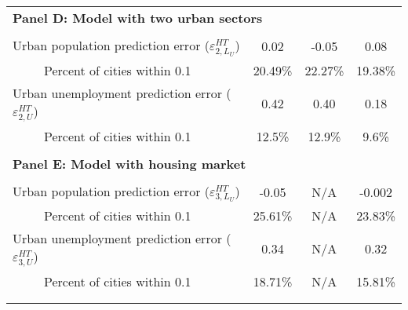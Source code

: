 \begin{tabular}{lccc}
\multicolumn{4}{l}{\textbf{Panel D: Model with two urban sectors}} \\
      &       &       &  \\
Urban population prediction error ($\varepsilon_{2,L_{U}}^{HT}$) & 0.02  & -0.05 & 0.08 \\
\medskip ~~~~~Percent of cities within 0.1 & 20.49\% & 22.27\% & 19.38\% \\
Urban unemployment prediction error ($\varepsilon_{2,U}^{HT}$)~~~~~~ & 0.42  & 0.40  & 0.18 \\
~~~~~Percent of cities within 0.1 & 12.5\% & 12.9\% & 9.6\% \\
      &       &       &  \\
\multicolumn{4}{l}{\textbf{Panel E: Model with  housing market}} \\
      &       &       &  \\
Urban population prediction error ($\varepsilon_{3,L_{U}}^{HT}$) & -0.05 & N/A   & -0.002 \\
\medskip ~~~~~Percent of cities within 0.1 & 25.61\% & N/A   & 23.83\% \\
Urban unemployment prediction error ($\varepsilon_{3,U}^{HT}$) & 0.34  & N/A   & 0.32 \\
~~~~~Percent of cities within 0.1 & 18.71\% & N/A   & 15.81\% \\
      &       &       &  \\
\bottomrule &       &       &  \\
\end{tabular}%
